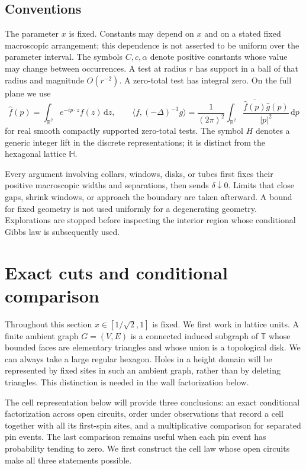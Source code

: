 \documentclass[11pt]{article}
\newcommand{\T}{\mathbb T}
\newcommand{\hexlat}{\mathbb H}
\newcommand{\R}{\mathbb R}
\newcommand{\dd}{\,\mathrm d}
\theoremstyle{definition}
\theoremstyle{remark}
\numberwithin{equation}{section}
\begin{document}
\subsection{Conventions}

The parameter $x$ is fixed.  Constants may depend on $x$ and on a stated
fixed macroscopic arrangement; this dependence is not asserted to be
uniform over the parameter interval.  The symbols $C,c,\alpha$ denote
positive constants whose value may change between occurrences.  A test
at radius $r$ has support in a ball of that radius and magnitude
$O(r^{-2})$.  A zero-total test has integral zero.  On the full plane we
use
\[
 \widehat f(p)=\int_{\R^2}e^{-ip\cdot z}f(z)\dd z,
 \qquad
 \langle f,(-\Delta)^{-1}g\rangle
 =\frac1{(2\pi)^2}\int_{\R^2}
       \frac{\overline{\widehat f(p)}\widehat g(p)}{|p|^2}\dd p
\]
for real smooth compactly supported zero-total tests.  The symbol $H$
denotes a generic integer lift in the discrete representations; it is
distinct from the hexagonal lattice $\hexlat$.

Every argument involving collars, windows, disks, or tubes first fixes
their positive macroscopic widths and separations, then sends
$\delta\downarrow0$.  Limits that close gaps, shrink windows, or approach
the boundary are taken afterward.  A bound for fixed geometry is not
used uniformly for a degenerating geometry.  Explorations are stopped
before inspecting the interior region whose conditional Gibbs law is
subsequently used.

\section{Exact cuts and conditional comparison}\label{sec:discrete}

Throughout this section $x\in[1/\sqrt2,1]$ is fixed. We first work in lattice
units. A finite ambient graph $G=(V,E)$ is a connected induced subgraph of
$\T$ whose bounded faces are elementary triangles and whose union is a
topological disk. We can always take a
large regular hexagon. Holes in a height domain will be represented by fixed
sites in such an ambient graph, rather than by deleting triangles. This
distinction is needed in the wall factorization below.

The cell representation below will provide three conclusions: an exact conditional
factorization across open circuits, order under observations that record a
cell together with all its first-spin sites, and a multiplicative comparison
for separated pin events.  The last comparison remains useful when each pin
event has probability tending to zero.  We first construct the cell law
whose open circuits make all three statements possible.
\end{document}
